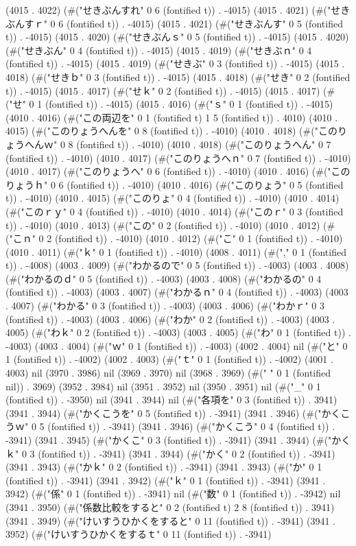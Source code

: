 (4015 . 4022) (#("せきぶんすれ" 0 6 (fontified t)) . -4015) (4015 . 4021) (#("せきぶんすｒ" 0 6 (fontified t)) . -4015) (4015 . 4021) (#("せきぶんす" 0 5 (fontified t)) . -4015) (4015 . 4020) (#("せきぶんｓ" 0 5 (fontified t)) . -4015) (4015 . 4020) (#("せきぶん" 0 4 (fontified t)) . -4015) (4015 . 4019) (#("せきぶｎ" 0 4 (fontified t)) . -4015) (4015 . 4019) (#("せきぶ" 0 3 (fontified t)) . -4015) (4015 . 4018) (#("せきｂ" 0 3 (fontified t)) . -4015) (4015 . 4018) (#("せき" 0 2 (fontified t)) . -4015) (4015 . 4017) (#("せｋ" 0 2 (fontified t)) . -4015) (4015 . 4017) (#("せ" 0 1 (fontified t)) . -4015) (4015 . 4016) (#("ｓ" 0 1 (fontified t)) . -4015) (4010 . 4016) (#("この両辺を" 0 1 (fontified t) 1 5 (fontified t)) . 4010) (4010 . 4015) (#("このりょうへんを" 0 8 (fontified t)) . -4010) (4010 . 4018) (#("このりょうへんｗ" 0 8 (fontified t)) . -4010) (4010 . 4018) (#("このりょうへん" 0 7 (fontified t)) . -4010) (4010 . 4017) (#("このりょうへｎ" 0 7 (fontified t)) . -4010) (4010 . 4017) (#("このりょうへ" 0 6 (fontified t)) . -4010) (4010 . 4016) (#("このりょうｈ" 0 6 (fontified t)) . -4010) (4010 . 4016) (#("このりょう" 0 5 (fontified t)) . -4010) (4010 . 4015) (#("このりょ" 0 4 (fontified t)) . -4010) (4010 . 4014) (#("このｒｙ" 0 4 (fontified t)) . -4010) (4010 . 4014) (#("このｒ" 0 3 (fontified t)) . -4010) (4010 . 4013) (#("この" 0 2 (fontified t)) . -4010) (4010 . 4012) (#("こｎ" 0 2 (fontified t)) . -4010) (4010 . 4012) (#("こ" 0 1 (fontified t)) . -4010) (4010 . 4011) (#("ｋ" 0 1 (fontified t)) . -4010) (4008 . 4011) (#("," 0 1 (fontified t)) . -4008) (4003 . 4009) (#("わかるので" 0 5 (fontified t)) . -4003) (4003 . 4008) (#("わかるのｄ" 0 5 (fontified t)) . -4003) (4003 . 4008) (#("わかるの" 0 4 (fontified t)) . -4003) (4003 . 4007) (#("わかるｎ" 0 4 (fontified t)) . -4003) (4003 . 4007) (#("わかる" 0 3 (fontified t)) . -4003) (4003 . 4006) (#("わかｒ" 0 3 (fontified t)) . -4003) (4003 . 4006) (#("わか" 0 2 (fontified t)) . -4003) (4003 . 4005) (#("わｋ" 0 2 (fontified t)) . -4003) (4003 . 4005) (#("わ" 0 1 (fontified t)) . -4003) (4003 . 4004) (#("ｗ" 0 1 (fontified t)) . -4003) (4002 . 4004) nil (#("と" 0 1 (fontified t)) . -4002) (4002 . 4003) (#("ｔ" 0 1 (fontified t)) . -4002) (4001 . 4003) nil (3970 . 3986) nil (3969 . 3970) nil (3968 . 3969) (#(" " 0 1 (fontified nil)) . 3969) (3952 . 3984) nil (3951 . 3952) nil (3950 . 3951) nil (#("_" 0 1 (fontified t)) . -3950) nil (3941 . 3944) nil (#("各項を" 0 3 (fontified t)) . 3941) (3941 . 3944) (#("かくこうを" 0 5 (fontified t)) . -3941) (3941 . 3946) (#("かくこうｗ" 0 5 (fontified t)) . -3941) (3941 . 3946) (#("かくこう" 0 4 (fontified t)) . -3941) (3941 . 3945) (#("かくこ" 0 3 (fontified t)) . -3941) (3941 . 3944) (#("かくｋ" 0 3 (fontified t)) . -3941) (3941 . 3944) (#("かく" 0 2 (fontified t)) . -3941) (3941 . 3943) (#("かｋ" 0 2 (fontified t)) . -3941) (3941 . 3943) (#("か" 0 1 (fontified t)) . -3941) (3941 . 3942) (#("ｋ" 0 1 (fontified t)) . -3941) (3941 . 3942) (#("係" 0 1 (fontified t)) . -3941) nil (#("数" 0 1 (fontified t)) . -3942) nil (3941 . 3950) (#("係数比較をすると" 0 2 (fontified t) 2 8 (fontified t)) . 3941) (3941 . 3949) (#("けいすうひかくをすると" 0 11 (fontified t)) . -3941) (3941 . 3952) (#("けいすうひかくをするｔ" 0 11 (fontified t)) . -3941) 